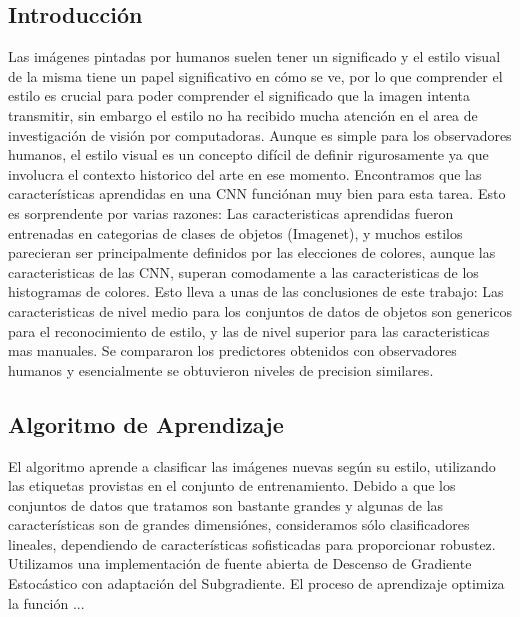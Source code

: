 \documentclass[a4paper,11pt,spanish]{book}
\begin{document}
    \subsection{Introducción}
      Las imágenes pintadas por humanos suelen tener un significado y el estilo visual de la misma tiene un papel significativo en cómo se ve, por lo que comprender
      el estilo es crucial para poder comprender el significado que la imagen intenta transmitir, sin embargo el estilo no ha recibido  mucha atención en el area de investigación de visión por computadoras.
      Aunque es simple para los observadores humanos, el estilo visual es un concepto difícil de definir rigurosamente ya que involucra el contexto historico del arte en ese momento.
      Encontramos que las características aprendidas en una CNN funciónan muy bien para esta tarea. Esto es sorprendente por varias razones: Las caracteristicas aprendidas
      fueron entrenadas en categorias de clases de objetos (Imagenet), y muchos estilos parecieran ser principalmente definidos por las elecciones de colores, aunque
      las caracteristicas de las CNN, superan comodamente a las caracteristicas de los histogramas de colores. Esto lleva a unas de las conclusiones de este trabajo:
      Las caracteristicas de nivel medio para los conjuntos de datos de objetos son genericos para el reconocimiento de estilo, y las de nivel superior para las caracteristicas
      mas manuales.
      Se compararon los predictores obtenidos con observadores humanos y esencialmente se obtuvieron niveles de precision similares.
    \subsection{Algoritmo de Aprendizaje}
      El algoritmo aprende a clasificar las imágenes nuevas según su estilo, utilizando las etiquetas provistas en el conjunto de entrenamiento.
      Debido a que los conjuntos de datos que tratamos son bastante grandes y algunas de las características son de grandes dimensiónes, consideramos sólo clasificadores lineales,
      dependiendo de características sofisticadas para proporcionar robustez. Utilizamos una implementación de fuente abierta de Descenso de Gradiente Estocástico con adaptación
      del Subgradiente. El proceso de aprendizaje optimiza la función ...
\end{document}
